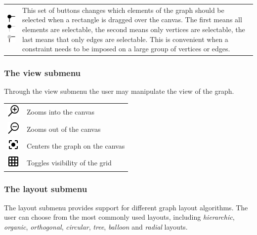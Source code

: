 {\begin{tabular}{p{}p{}}
\includegraphics[scale=0.6]{figures/icons/marquee_all.png}  \includegraphics[scale=0.6]{figures/icons/marquee_nodes.png}  \includegraphics[scale=0.6]{figures/icons/marquee_edges.png} & This set of buttons changes which elements of the graph should be selected when a rectangle is dragged over the canvas. The first means all elements are selectable, the second means only vertices are selectable, the last means that only edges are selectable. This is convenient when a constraint needs to be imposed on a large group of vertices or edges.
\end{tabular}
\subsubsection{The view submenu}
Through the view submenu the user may manipulate the view of the graph.\\[7pt]
\begin{tabular}{p{}p{}}
\includegraphics[scale=0.6]{figures/icons/zoomin.png} &  Zooms into the canvas\\
\includegraphics[scale=0.6]{figures/icons/zoomout.png}&  Zooms out of the canvas\\
\includegraphics[scale=0.6]{figures/icons/focus.png} & Centers the graph on the canvas\\
\includegraphics[scale=0.6]{figures/icons/grid.png} & Toggles visibility of the grid
\end{tabular}
\subsubsection{The layout submenu}
The layout submenu provides support for different graph layout algorithms. The user can choose from the most commonly used layouts, including \textit{hierarchic}, \textit{organic}, \textit{orthogonal}, \textit{circular}, \textit{tree}, \textit{balloon} and \textit{radial} layouts.
}
